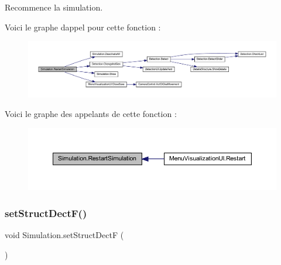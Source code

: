 Recommence la simulation. 

Voici le graphe d\textquotesingle{}appel pour cette fonction \+:
\nopagebreak
\begin{figure}[H]
\begin{center}
\leavevmode
\includegraphics[width=350pt]{class_simulation_a500982098740ae238f349a6fed0affd8_cgraph}
\end{center}
\end{figure}
Voici le graphe des appelants de cette fonction \+:
\nopagebreak
\begin{figure}[H]
\begin{center}
\leavevmode
\includegraphics[width=350pt]{class_simulation_a500982098740ae238f349a6fed0affd8_icgraph}
\end{center}
\end{figure}
\mbox{\label{class_simulation_a93ab4fa0107498061196ce3a051d292d}} 
\subsubsection{\texorpdfstring{set\+Struct\+Dect\+F()}{setStructDectF()}}
{\footnotesize\ttfamily void Simulation.\+set\+Struct\+DectF (\begin{DoxyParamCaption}{ }\end{DoxyParamCaption})\hspace{0.3cm}{\ttfamily [inline]}}

\mbox{\label{class_simulation_a19b96b4354d41349e367d282cc4e88aa}} 
